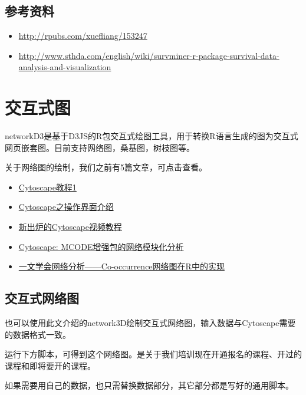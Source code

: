 \documentclass[]{article}
\providecommand{\tightlist}{%
  \setlength{\itemsep}{0pt}\setlength{\parskip}{0pt}}
\numberwithin{figure}{section}
\numberwithin{table}{section}
\theoremstyle{definition}
\theoremstyle{definition}
\theoremstyle{definition}
\theoremstyle{remark}
\begin{document}
\subsection{参考资料}\label{-1}

\begin{itemize}
\tightlist
\item
  \url{http://rpubs.com/xuefliang/153247}
\item
  \url{http://www.sthda.com/english/wiki/survminer-r-package-survival-data-analysis-and-visualization}
\end{itemize}

\section{交互式图}

networkD3是基于D3JS的R包交互式绘图工具，用于转换R语言生成的图为交互式网页嵌套图。目前支持网络图，桑基图，树枝图等。

关于网络图的绘制，我们之前有5篇文章，可点击查看。

\begin{itemize}
\tightlist
\item
  \href{http://mp.weixin.qq.com/s/m9uJm8GwSXb3xaRxtod08Q}{Cytoscape教程1}
\item
  \href{http://mp.weixin.qq.com/s/ZSoW7-qWs3BuSB7bkDnfmA}{Cytoscape之操作界面介绍}
\item
  \href{http://mp.weixin.qq.com/s/sKEy_Pn9qnWw4W-aXraA5g}{新出炉的Cytoscape视频教程}
\item
  \href{http://mp.weixin.qq.com/s/jGHuP1ikCX0n3vKfS3VXPQ}{Cytoscape:
  MCODE增强包的网络模块化分析}
\item
  \href{http://mp.weixin.qq.com/s/s-Si_s5pk7EF5gueqruBRQ}{一文学会网络分析------Co-occurrence网络图在R中的实现}
\end{itemize}

\subsection{交互式网络图}

也可以使用此文介绍的network3D绘制交互式网络图，输入数据与Cytoscape需要的数据格式一致。

运行下方脚本，可得到这个网络图。是关于我们培训现在开通报名的课程、开过的课程和即将要开的课程。

如果需要用自己的数据，也只需替换数据部分，其它部分都是写好的通用脚本。
\end{document}
